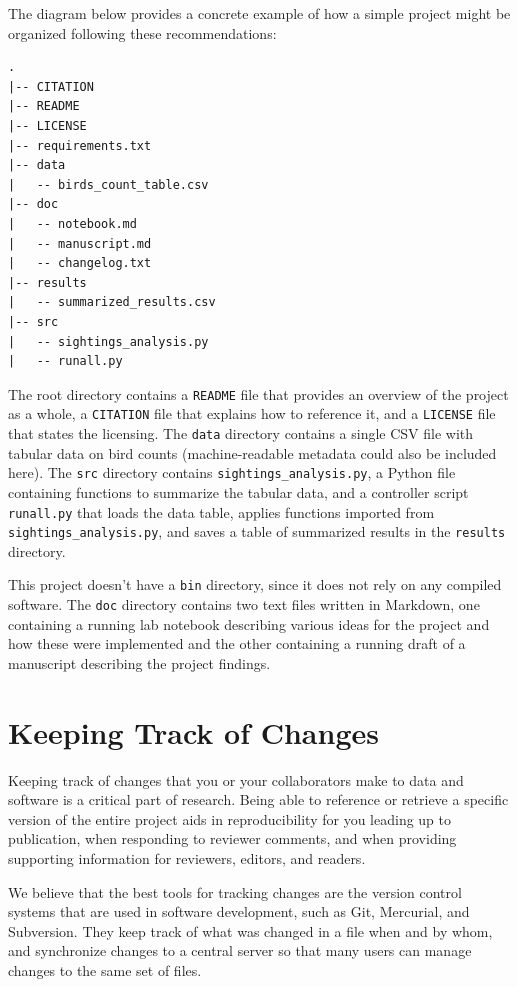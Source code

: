 \documentclass[10pt,letterpaper]{article}
\newcommand{\practicesection}[2]{\section{#1}\label{#2}}
\begin{document}
The diagram below provides a concrete example of how a simple project
might be organized following these recommendations:

{\small
\begin{verbatim}
.
|-- CITATION
|-- README
|-- LICENSE
|-- requirements.txt
|-- data
|   -- birds_count_table.csv
|-- doc
|   -- notebook.md
|   -- manuscript.md
|   -- changelog.txt
|-- results
|   -- summarized_results.csv
|-- src
|   -- sightings_analysis.py
|   -- runall.py
\end{verbatim}
}

The root directory contains a \texttt{README} file that provides an
overview of the project as a whole, a \texttt{CITATION} file that
explains how to reference it, and a \texttt{LICENSE} file that states the
licensing. The \texttt{data} directory contains a
single CSV file with tabular data on bird counts (machine-readable
metadata could also be included here). The \texttt{src} directory
contains \texttt{sightings\_analysis.py}, a Python file containing
functions to summarize the tabular data, and a controller script
\texttt{runall.py} that loads the data table, applies functions
imported from \texttt{sightings\_analysis.py}, and saves a table of
summarized results in the \texttt{results} directory.

This project doesn't have a \texttt{bin} directory, since it does not
rely on any compiled software. The \texttt{doc} directory contains two
text files written in Markdown, one containing a running lab notebook
describing various ideas for the project and how these were
implemented and the other containing a running draft of a manuscript
describing the project findings.

\practicesection{Keeping Track of Changes}{sec:versioning}

Keeping track of changes that you or your collaborators make to data
and software is a critical part of research. Being able to reference or
retrieve a specific version of the entire project aids in reproducibility
for you leading up to publication, when responding to reviewer comments,
and when providing supporting information for reviewers, editors,
and readers.

We believe that the best tools for tracking changes are the version
control systems that are used in software development, such as Git,
Mercurial, and Subversion. They keep track of what was changed in a
file when and by whom, and synchronize changes to a central server so
that many users can manage changes to the same set of files.
\end{document}
